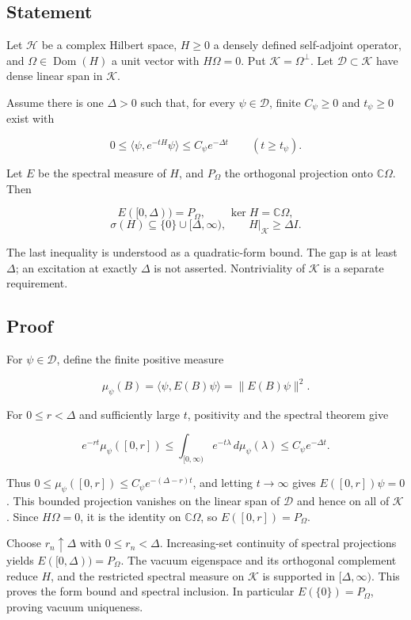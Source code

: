 \documentclass[
  11pt,
  letterpaper,
]{article}
\begin{document}
\subsection{Statement}\label{statement}

Let \(\mathscr H\) be a complex Hilbert space, \(H\ge0\) a densely
defined self-adjoint operator, and \(\Omega\in\operatorname{Dom}(H)\) a
unit vector with \(H\Omega=0\). Put \(\mathscr K=\Omega^\perp\). Let
\(\mathcal D\subset\mathscr K\) have dense linear span in
\(\mathscr K\).

Assume there is one \(\Delta>0\) such that, for every
\(\psi\in\mathcal D\), finite \(C_\psi\ge0\) and \(t_\psi\ge0\) exist
with

\[
0\le\langle\psi,e^{-tH}\psi\rangle
\le C_\psi e^{-\Delta t}\qquad(t\ge t_\psi).
\tag{SG}
\]

Let \(E\) be the spectral measure of \(H\), and \(P_\Omega\) the
orthogonal projection onto \(\mathbb C\Omega\). Then

\[
E([0,\Delta))=P_\Omega,\qquad
\ker H=\mathbb C\Omega,
\] \[
\sigma(H)\subseteq\{0\}\cup[\Delta,\infty),\qquad
H|_{\mathscr K}\ge\Delta I.
\]

The last inequality is understood as a quadratic-form bound. The gap is
at least \(\Delta\); an excitation at exactly \(\Delta\) is not
asserted. Nontriviality of \(\mathscr K\) is a separate requirement.

\subsection{Proof}\label{proof}

For \(\psi\in\mathcal D\), define the finite positive measure

\[
\mu_\psi(B)=\langle\psi,E(B)\psi\rangle
=\|E(B)\psi\|^2.
\]

For \(0\le r<\Delta\) and sufficiently large \(t\), positivity and the
spectral theorem give

\[
e^{-rt}\mu_\psi([0,r])
\le\int_{[0,\infty)}e^{-t\lambda}\,d\mu_\psi(\lambda)
\le C_\psi e^{-\Delta t}.
\]

Thus \(0\le\mu_\psi([0,r])\le C_\psi e^{-(\Delta-r)t}\), and letting
\(t\to\infty\) gives \(E([0,r])\psi=0\). This bounded projection
vanishes on the linear span of \(\mathcal D\) and hence on all of
\(\mathscr K\). Since \(H\Omega=0\), it is the identity on
\(\mathbb C\Omega\), so \(E([0,r])=P_\Omega\).

Choose \(r_n\uparrow\Delta\) with \(0\le r_n<\Delta\). Increasing-set
continuity of spectral projections yields \(E([0,\Delta))=P_\Omega\).
The vacuum eigenspace and its orthogonal complement reduce \(H\), and
the restricted spectral measure on \(\mathscr K\) is supported in
\([\Delta,\infty)\). This proves the form bound and spectral inclusion.
In particular \(E(\{0\})=P_\Omega\), proving vacuum uniqueness.
\end{document}

